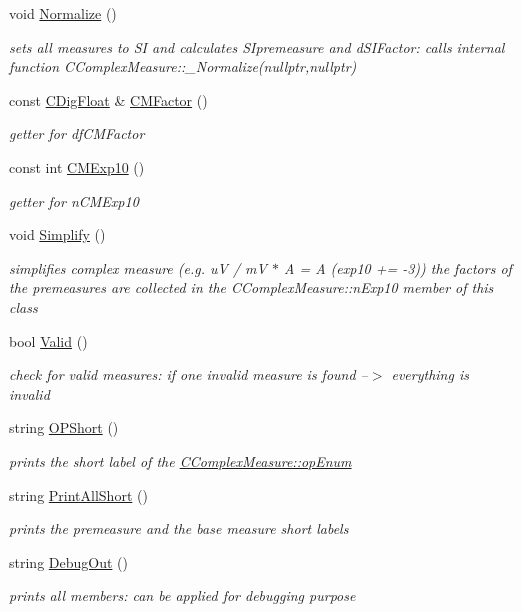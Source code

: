\begin{DoxyCompactItemize}
void \hyperlink{classCComplexMeasure_a87cc1f3c3f0dafd7cbe00634124c8d46}{Normalize} ()
\begin{DoxyCompactList}\small\item\em sets all measures to SI and calculates S\+Ipremeasure and d\+S\+I\+Factor\+: calls internal function C\+Complex\+Measure\+::\+\_\+\+Normalize(nullptr,nullptr) \end{DoxyCompactList}\item 
const \hyperlink{classCDigFloat}{C\+Dig\+Float} \& \hyperlink{classCComplexMeasure_acdcab22efa233ea1c0e607bf22028afd}{C\+M\+Factor} ()
\begin{DoxyCompactList}\small\item\em getter for df\+C\+M\+Factor \end{DoxyCompactList}\item 
const int \hyperlink{classCComplexMeasure_a06355541d6d9b843b9d68156a0297f51}{C\+M\+Exp10} ()
\begin{DoxyCompactList}\small\item\em getter for n\+C\+M\+Exp10 \end{DoxyCompactList}\item 
void \hyperlink{classCComplexMeasure_addb4e69033f2c32fb3bf4a3aef5e1470}{Simplify} ()
\begin{DoxyCompactList}\small\item\em simplifies complex measure (e.\+g. uV / mV $\ast$ A = A (exp10 += -\/3)) the factors of the premeasures are collected in the C\+Complex\+Measure\+::n\+Exp10 member of this class \end{DoxyCompactList}\item 
bool \hyperlink{classCComplexMeasure_a1b777eef864d0c7a959dbeee321e881d}{Valid} ()
\begin{DoxyCompactList}\small\item\em check for valid measures\+: if one invalid measure is found --$>$ everything is invalid \end{DoxyCompactList}\item 
string \hyperlink{classCComplexMeasure_ab6a38e7259d7c27e735ff12fd711c5d5}{O\+P\+Short} ()
\begin{DoxyCompactList}\small\item\em prints the short label of the \hyperlink{classCComplexMeasure_ae22369976a7e5570add11a4172dcf062}{C\+Complex\+Measure\+::op\+Enum} \end{DoxyCompactList}\item 
string \hyperlink{classCComplexMeasure_aefe6745e32e203d0dd2b7a4e13504142}{Print\+All\+Short} ()
\begin{DoxyCompactList}\small\item\em prints the premeasure and the base measure short labels \end{DoxyCompactList}\item 
string \hyperlink{classCComplexMeasure_a83c00029eaad1c0c59fd1210108981dc}{Debug\+Out} ()
\begin{DoxyCompactList}\small\item\em prints all members\+: can be applied for debugging purpose \end{DoxyCompactList}\end{DoxyCompactItemize}

